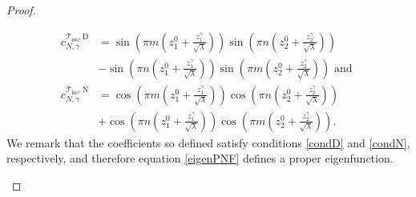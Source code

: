 \documentclass{amsart}
\theoremstyle{definition}
\theoremstyle{remark}
\numberwithin{equation}{section}
\theoremstyle{definition}
\theoremstyle{remark}
\begin{document}
\begin{proof}
\begin{itemize}
\begin{equation}
\begin{aligned}
				c_{N,\gamma}^{\mathcal{T}_\mathrm{iso},\mathrm{D}}&=\sin\left(\pi m\left(z_1^0+\frac{z_1^\gamma}{\sqrt{\lambda}}\right)\right)\sin\left(\pi n\left(z_2^0+\frac{z_2^\gamma}{\sqrt{\lambda}}\right)\right)\\&-\sin\left(\pi n\left(z_1^0+\frac{z_1^\gamma}{\sqrt{\lambda}}\right)\right)\sin\left(\pi m\left(z_2^0+\frac{z_2^\gamma}{\sqrt{\lambda}}\right)\right)\text{ and }\\
				c_{N,\gamma}^{\mathcal{T}_\mathrm{iso},\mathrm{N}}&=\cos\left(\pi m\left(z_1^0+\frac{z_1^\gamma}{\sqrt{\lambda}}\right)\right)\cos\left(\pi n\left(z_2^0+\frac{z_2^\gamma}{\sqrt{\lambda}}\right)\right)\\&+\cos\left(\pi n\left(z_1^0+\frac{z_1^\gamma}{\sqrt{\lambda}}\right)\right)\cos\left(\pi m\left(z_2^0+\frac{z_2^\gamma}{\sqrt{\lambda}}\right)\right).
			\end{aligned}
		\end{equation}
		We remark that the coefficients so defined satisfy conditions \eqref{condD} and \eqref{condN}, respectively, and therefore equation \eqref{eigenPNF} defines a proper eigenfunction.
		

\end{itemize}
\end{proof}
\end{document}
